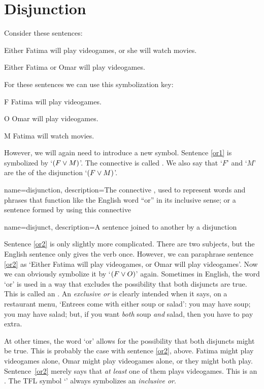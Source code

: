 \section{Disjunction}

Consider these sentences:
	\begin{earg}
		\item[\ex{or1}]Either Fatima will play videogames, or she will watch movies.
		\item[\ex{or2}]Either Fatima or Omar will play videogames.
	\end{earg}
For these sentences we can use this symbolization key:
	\begin{ekey}
		\item[F] Fatima will play videogames.
		\item[O] Omar will play videogames.
		\item[M] Fatima will watch movies.
	\end{ekey}
However, we will again need to introduce a new symbol. Sentence \ref{or1} is symbolized by `$(F \vee M)$'. The connective is called . We also say that `$F$' and `$M$' are the  of the disjunction `$(F \vee M)$'.

{
name=disjunction,
description={The connective \eor, used to represent words and phrases that function like the English word ``or'' in its inclusive sense; or a sentence formed by using this connective}
}

{
name=disjunct,
description={A sentence joined to another by a \gls{disjunction}}
}

Sentence \ref{or2} is only slightly more complicated. There are two subjects, but the English sentence only gives the verb once. However, we can paraphrase sentence \ref{or2} as `Either Fatima will play videogames, or Omar will play videogames'. Now we can obviously symbolize it by `$(F \vee O)$' again.
Sometimes in English, the word `or' is used in a way that excludes the possibility that both disjuncts are true. This is called an .  An \emph{exclusive or} is clearly intended when it says, on a restaurant menu, `Entrees come with either soup or salad': you may have soup; you may have salad; but, if you want \emph{both} soup \emph{and} salad, then you have to pay extra.

At other times, the word `or' allows for the possibility that both disjuncts might be true. This is probably the case with sentence \ref{or2}, above. Fatima might play videogames alone, Omar might play videogames alone, or they might both play. Sentence~\ref{or2} merely says that \emph{at least} one of them plays videogames. This is an . The TFL symbol `\eor' always symbolizes an \emph{inclusive or}.

